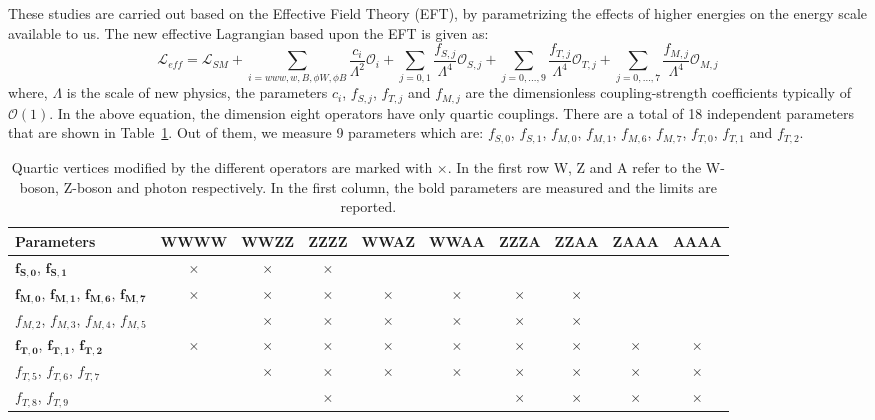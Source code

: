 These studies are carried out based on the Effective Field Theory (EFT), by parametrizing the effects of higher energies on the energy scale available to us. The new effective Lagrangian based upon the EFT is given as:
\begin{equation}
	\mathcal{L}_{eff} = \mathcal{L}_{SM} + \sum_{i=www,w,B, \phi W, \phi B} \frac{c_i}{\Lambda^2} {\mathcal{O}}_i + \sum_{j=0,1}\frac{f_{S,j}}{\Lambda^4} \mathcal{O}_{S,j} + \sum_{j=0,...,9}\frac{f_{T,j}}{\Lambda^4} \mathcal{O}_{T,j}  + \sum_{j=0,...,7} \frac{f_{M,j}}{\Lambda^4} \mathcal{O}_{M,j}
\end{equation}
where, $\Lambda$ is the scale of new physics, the parameters $c_i$, $f_{S,j}$, $f_{T,j}$ and $f_{M,j}$ are the dimensionless coupling-strength coefficients typically of $\mathcal{O}(1)$. In the above equation, the dimension eight operators have only quartic couplings. There are a total of 18 independent parameters that are shown in Table~\ref{table:aQGC_alloperator}. Out of them, we measure 9 parameters which are: $f_{S,0}$, $f_{S,1}$, $f_{M,0}$, $f_{M,1}$, $f_{M,6}$, $f_{M,7}$, $f_{T,0}$, $f_{T,1}$ and $f_{T,2}$. 
\begin{table}
\centering
{\scriptsize
\begin{tabular}[!htbp]{|l | c  |c  |c  |c  |c  |c  |c | c  |c |}
\hline
 Parameters   & WWWW & WWZZ & ZZZZ & WWAZ & WWAA & ZZZA & ZZAA & ZAAA & AAAA \\
\hline
$\bm{f_{S,0}}$, $\bm{f_{S,1}}$ &$\bm{\times}$ & $\bm{\times}$&$\bm{\times}$ & & & & & & \\
\hline
$\bm{f_{M,0}}$, $\bm{f_{M,1}}$, $\bm{f_{M,6}}$, $\bm{f_{M,7}}$  &$\bm{\times}$ &$\bm{\times}$ &$\bm{\times}$ &$\bm{\times}$ &$\bm{\times}$ &$\bm{\times}$ &$\bm{\times}$ & & \\
\hline
$f_{M,2}$, $f_{M,3}$, $f_{M,4}$, $f_{M,5}$  & &$\times$ &$\times$ &$\times$ &$\times$ &$\times$ &$\times$ & & \\
\hline
$\bm{f_{T,0}}$, $\bm{f_{T,1}}$, $\bm{f_{T,2}}$ &$\bm{\times}$ &$\bm{\times}$ &$\bm{\times}$ &$\bm{\times}$ &$\bm{\times}$ &$\bm{\times}$ &$\bm{\times}$ &$\bm{\times}$ &$\bm{\times}$ \\
\hline
$f_{T,5}$, $f_{T,6}$, $f_{T,7}$ & &$\times$ &$\times$ &$\times$ &$\times$ &$\times$ &$\times$ &$\times$ &$\times$ \\
\hline
$f_{T,8}$, $f_{T,9}$  & & &$\times$ & & &$\times$ &$\times$ &$\times$ &$\times$ \\
\hline
\end{tabular}
\caption{Quartic vertices modified by the different operators are marked with $\times$. In the first row W, Z and A refer to the W-boson, Z-boson and photon respectively. In the first column, the bold parameters are measured and the limits are reported.}
\label{table:aQGC_alloperator}}
\end{table}
%

